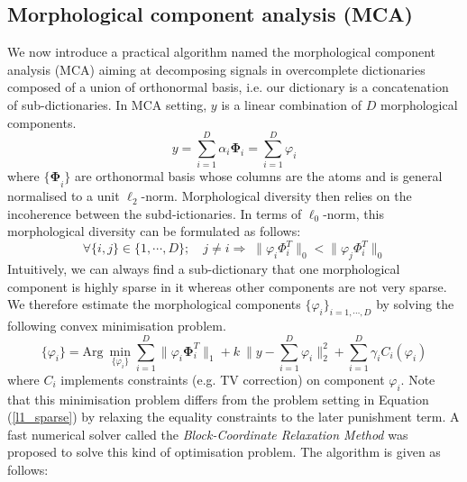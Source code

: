 \subsection{Morphological component analysis (MCA)}
We now introduce a practical algorithm named the morphological component analysis (MCA) aiming at decomposing signals in overcomplete dictionaries composed of a union of orthonormal basis, i.e. our dictionary is a concatenation of sub-dictionaries. In MCA setting, $y$ is a linear combination of $D$ morphological components. 
\begin{equation}
    y = \sum_{i=1}^D  \alpha_i \mathbf{\Phi}_i = \sum_{i=1}^D \varphi_i
    \label{Eq_dictionary}
\end{equation}
where $\mathbf{\{\Phi}_i\}$ are orthonormal basis whose columns are the atoms and is general normalised to a unit $\ell_2$-norm. Morphological diversity then relies on the incoherence between the subd-ictionaries. In terms of $\ell_0$-norm, this morphological diversity can be formulated as follows:
\begin{equation}
    \forall\{i,j\} \in \{1,\cdots,D\};\quad j \neq i \Rightarrow \; \lVert \varphi_i \Phi_i^T \rVert_0 < \lVert \varphi_j \Phi_i^T \rVert_0
\end{equation}
Intuitively, we can always find a sub-dictionary that one morphological component is highly sparse in it whereas other components are not very sparse. We therefore estimate the morphological components $\{\varphi_i\}_{i=1,\cdots,D}$ by solving the following convex minimisation problem.
\begin{equation}
    \{\varphi_i\} = \text{Arg} \: \min_{\{\varphi_i\}}\sum_{i=1}^D \lVert\varphi_i \mathbf{\Phi}_i^T \rVert_{1} + k \:\lVert y-\sum_{i=1}^D\varphi_i \rVert^2_2 +  \sum_{i=1}^D \gamma_i C_i (\varphi_i)
    \label{MCAequation}
\end{equation}
where $C_i$ implements constraints (e.g. TV correction) on component $\varphi_i$. Note that this minimisation problem differs from the problem setting in Equation (\ref{l1_sparse}) by relaxing the equality constraints to the later punishment term. A fast numerical solver called the \textit{Block-Coordinate Relaxation Method} \cite{BlockCoordinateMethod} was proposed to solve this kind of optimisation problem. 
The algorithm is given as follows:

